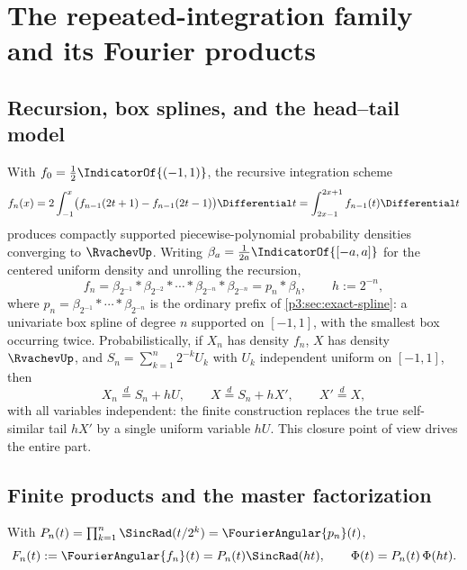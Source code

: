 \documentclass[11pt,oneside]{article}
\numberwithin{equation}{section}
\theoremstyle{definition}
\theoremstyle{remark}
\begin{document}
\section{The repeated-integration family and its Fourier products}
\label{p4:sec:w-objects}

\subsection{Recursion, box splines, and the head--tail model}

With $f_0=\tfrac12\IndicatorOf{(-1,1)}$, the recursive integration scheme
\begin{equation}
 f_n(x)=2\int_{-1}^{x}\bigl(f_{n-1}(2t+1)-f_{n-1}(2t-1)\bigr)\Differential t
 =\int_{2x-1}^{2x+1}f_{n-1}(t)\Differential t
 \label{p4:eq:w-recursion}
\end{equation}
produces compactly supported piecewise-polynomial probability densities
converging to $\RvachevUp$.  Writing $\beta_a=\tfrac1{2a}\IndicatorOf{[-a,a]}$ for
the centered uniform density and unrolling the recursion,
\begin{equation}
 f_n=\beta_{2^{-1}}*\beta_{2^{-2}}*\cdots*\beta_{2^{-n}}*\beta_{2^{-n}}
 =p_n*\beta_h,
 \qquad h:=2^{-n},
 \label{p4:eq:w-convolution}
\end{equation}
where $p_n=\beta_{2^{-1}}*\cdots*\beta_{2^{-n}}$ is the ordinary prefix of
\cref{p3:sec:exact-spline}: a univariate box spline of degree $n$ supported
on $[-1,1]$, with the smallest box occurring twice.  Probabilistically, if
$X_n$ has density $f_n$, $X$ has density $\RvachevUp$, and
$S_n=\sum_{k=1}^{n}2^{-k}U_k$ with $U_k$ independent uniform on $[-1,1]$,
then
\begin{equation}
 X_n\overset d=S_n+hU,
 \qquad
 X\overset d=S_n+hX',
 \qquad X'\overset d=X,
 \label{p4:eq:w-tail-models}
\end{equation}
with all variables independent: the finite construction replaces the true
self-similar tail $hX'$ by a single uniform variable $hU$.  This closure
point of view drives the entire part.

\subsection{Finite products and the master factorization}

With $P_n(t)=\prod_{k=1}^{n}\SincRad(t/2^k)=\FourierAngular{p_n}(t)$,
\begin{equation}
 F_n(t):=\FourierAngular{f_n}(t)=P_n(t)\SincRad(ht),
 \qquad
 \Phi(t)=P_n(t)\,\Phi(ht).
 \label{p4:eq:w-two-products}
\end{equation}
\end{document}
